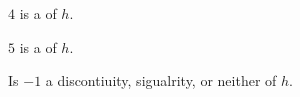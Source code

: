 \documentclass{ximera}
\begin{document}
\begin{example}
\begin{question}
$4$ is a  of $h$.


\end{question}





\begin{question}

$5$ is a  of $h$.


\end{question}





\begin{question}

Is $-1$ a discontiuity, sigualrity, or neither of $h$.

\begin{multipleChoice}
\end{multipleChoice}


\end{question}







\end{example}
\end{document}

